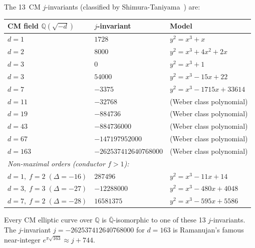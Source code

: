 \documentclass[11pt]{article}
\theoremstyle{definition}
\theoremstyle{remark}
\newcommand{\Q}{\mathbb{Q}}
\newcommand{\Qbar}{\overline{\Q}}
\begin{document}
The 13~CM $j$-invariants (classified by Shimura-Taniyama~\cite{Shimura1971}) are:
\begin{center}
\small
\begin{tabular}{lll}
\toprule
\textbf{CM field $\Q(\sqrt{-d})$} & \textbf{$j$-invariant} & \textbf{Model} \\
\midrule
$d = 1$ & $1728$ & $y^2 = x^3 + x$ \\
$d = 2$ & $8000$ & $y^2 = x^3 + 4x^2 + 2x$ \\
$d = 3$ & $0$ & $y^2 = x^3 + 1$ \\
$d = 3$ & $54000$ & $y^2 = x^3 - 15x + 22$ \\
$d = 7$ & $-3375$ & $y^2 = x^3 - 1715x + 33614$ \\
$d = 11$ & $-32768$ & (Weber class polynomial) \\
$d = 19$ & $-884736$ & (Weber class polynomial) \\
$d = 43$ & $-884736000$ & (Weber class polynomial) \\
$d = 67$ & $-147197952000$ & (Weber class polynomial) \\
$d = 163$ & $-262537412640768000$ & (Weber class polynomial) \\
\midrule
\multicolumn{3}{l}{\emph{Non-maximal orders (conductor $f > 1$):}} \\
$d = 1,\; f = 2\; (\Delta = -16)$ & $287496$ & $y^2 = x^3 - 11x + 14$ \\
$d = 3,\; f = 3\; (\Delta = -27)$ & $-12288000$ & $y^2 = x^3 - 480x + 4048$ \\
$d = 7,\; f = 2\; (\Delta = -28)$ & $16581375$ & $y^2 = x^3 - 595x + 5586$ \\
\bottomrule
\end{tabular}
\end{center}
\smallskip\noindent
Every CM elliptic curve over $\Q$ is $\Qbar$-isomorphic to one of these 13 $j$-invariants. The $j$-invariant $j = -262537412640768000$ for $d = 163$ is Ramanujan's famous near-integer $e^{\pi\sqrt{163}} \approx j + 744$.
\end{document}
